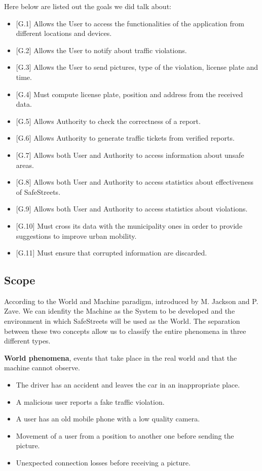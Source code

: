 Here below are listed out the goals we did talk about:

\begin{itemize}
\item {[G.1]} Allows the User to access the functionalities of the application from different locations and devices.
\item {[G.2]} Allows the User to notify about traffic violations.
\item {[G.3]} Allows the User to send pictures, type of the violation, license plate and time.
\item {[G.4]} Must compute license plate, position and address from the received data.
\item {[G.5]} Allows Authority to check the correctness of a report.
\item {[G.6]} Allows Authority to generate traffic tickets from verified reports.
\item {[G.7]} Allows both User and Authority to access information about unsafe areas.
\item {[G.8]} Allows both User and Authority to access statistics about effectiveness of SafeStreets.
\item {[G.9]} Allows both User and Authority to access statistics about violations.
\item {[G.10]} Must cross its data with the municipality ones in order to provide suggestions to improve urban mobility.
\item {[G.11]} Must ensure that corrupted information are discarded.


\end{itemize}

\subsection{Scope}
    According to the World and Machine paradigm, introduced by M. Jackson and P. Zave. We can idenfity the Machine as the System to be developed and the environment in which SafeStreets will be used as the World. The separation between these two concepts allow us to classify the entire phenomena in three different types.
    \vspace{0.5cm}
    
    
    \noindent\textbf{World phenomena}, events that take place in the real world and that the machine cannot observe.
    \begin{itemize}
      \item The driver has an accident and leaves the car in an inappropriate place.
      \item A malicious user reports a fake traffic violation.
      \item A user has an old mobile phone with a low quality camera.
      \item Movement of a user from a position to another one before sending the picture.
      \item Unexpected connection losses before receiving a picture.
    \end{itemize}
    \vspace{0.5cm}
    
